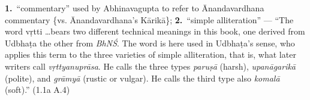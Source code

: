 \documentclass[10pt]{article}
\begin{document}
\begin{multicols}{2}
\begin{enumerate}[
			leftmargin=0em,
			rightmargin=0em,
		]
		 \textbf{1.}\ ``commentary'' used by Abhinavagupta to refer to Ānandavardhana commentary \{vs. Ānanda\-var\-dhana's Kārikā\};
		\textbf{2.}\ ``simple alliteration'' ---
		``The word vṛtti \dots bears two different technical meanings in this book, one derived from Udbhaṭa the other from \textit{BhNŚ}. The word is here used in Udbhaṭa's sense, who applies this term to the three varieties of simple alliteration, that is, what later writers call \textit{vṛttyanuprāsa}. He calls the three types \textit{paruṣā} (harsh), \textit{upanāgarikā} (polite), and \textit{grāmyā} (rustic or vulgar). He calls the third type also \textit{komalā} (soft).'' (1.1a A.4)

\end{enumerate}
\end{multicols}
\end{document}
